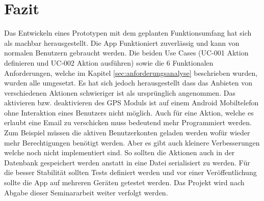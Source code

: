 \chapter{Fazit}
\label{sec:fazit}
Das Entwickeln eines Prototypen mit dem geplanten Funktionsumfang hat sich als machbar herausgestellt. Die App Funktioniert zuverlässig und kann von normalen Benutzern gebraucht werden. Die beiden Use Cases (UC-001 Aktion definieren und UC-002 Aktion ausführen) sowie die 6 Funktionalen Anforderungen, welche im Kapitel \ref{sec:anforderungsanalyse} beschrieben wurden, wurden alle umgesetzt. \newline{} Es hat sich jedoch herausgestellt dass das Anbieten von verschiedenen Aktionen schwieriger ist als ursprünglich angenommen. Das aktivieren bzw. deaktivieren des GPS Moduls ist auf einem Android Mobiltelefon ohne Interaktion eines Benutzers nicht möglich. Auch für eine Aktion, welche es erlaubt eine Email zu verschicken muss bedeutend mehr Programmiert werden. Zum Beispiel müssen die aktiven Benutzerkonten geladen werden wofür wieder mehr Berechtigungen benötigt werden. Aber es gibt auch kleinere Verbesserungen welche noch nicht implementiert sind. So sollten die Aktionen auch in der Datenbank gespeichert werden anstatt in eine Datei serialisiert zu werden. Für die besser Stabilität sollten Tests definiert werden und vor einer Veröffentlichung sollte die App auf mehreren Geräten getestet werden. Das Projekt wird nach Abgabe dieser Seminararbeit weiter verfolgt werden.